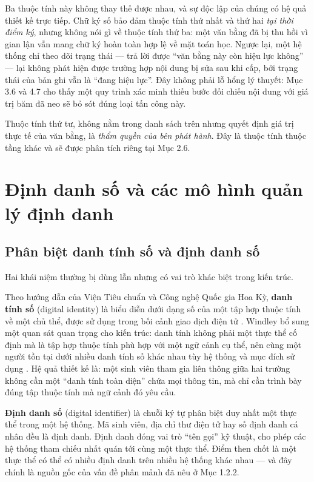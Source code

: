 Ba thuộc tính này không thay thế được nhau, và sự độc lập của chúng có hệ quả thiết kế trực tiếp. Chữ ký số bảo đảm thuộc tính thứ nhất và thứ hai \emph{tại thời điểm ký}, nhưng không nói gì về thuộc tính thứ ba: một văn bằng đã bị thu hồi vì gian lận vẫn mang chữ ký hoàn toàn hợp lệ về mặt toán học. Ngược lại, một hệ thống chỉ theo dõi trạng thái --- trả lời được {``}văn bằng này còn hiệu lực không{''} --- lại không phát hiện được trường hợp nội dung bị sửa sau khi cấp, bởi trạng thái của bản ghi vẫn là {``}đang hiệu lực{''}. Đây không phải lỗ hổng lý thuyết: Mục 3.6 và 4.7 cho thấy một quy trình xác minh thiếu bước đối chiếu nội dung với giá trị băm đã neo sẽ bỏ sót đúng loại tấn công này.

Thuộc tính thứ tư, không nằm trong danh sách trên nhưng quyết định giá trị thực tế của văn bằng, là \emph{thẩm quyền của bên phát hành}. Đây là thuộc tính thuộc tầng khác và sẽ được phân tích riêng tại Mục 2.6.

\section{Định danh số và các mô hình quản lý định danh}

\subsection{Phân biệt danh tính số và định danh số}

Hai khái niệm thường bị dùng lẫn nhưng có vai trò khác biệt trong kiến trúc.

Theo hướng dẫn của Viện Tiêu chuẩn và Công nghệ Quốc gia Hoa Kỳ, \textbf{danh tính số} (digital identity) là biểu diễn dưới dạng số của một tập hợp thuộc tính về một chủ thể, được sử dụng trong bối cảnh giao dịch điện tử \cite{NIST_SP800_63_3}. Windley bổ sung một quan sát quan trọng cho kiến trúc: danh tính không phải một thực thể cố định mà là tập hợp thuộc tính phù hợp với một ngữ cảnh cụ thể, nên cùng một người tồn tại dưới nhiều danh tính số khác nhau tùy hệ thống và mục đích sử dụng \cite{Windley2023}. Hệ quả thiết kế là: một sinh viên tham gia liên thông giữa hai trường không cần một {``}danh tính toàn diện{''} chứa mọi thông tin, mà chỉ cần trình bày đúng tập thuộc tính mà ngữ cảnh đó yêu cầu.

\textbf{Định danh số} (digital identifier) là chuỗi ký tự phân biệt duy nhất một thực thể trong một hệ thống. Mã sinh viên, địa chỉ thư điện tử hay số định danh cá nhân đều là định danh. Định danh đóng vai trò {``}tên gọi{''} kỹ thuật, cho phép các hệ thống tham chiếu nhất quán tới cùng một thực thể. Điểm then chốt là một thực thể có thể có nhiều định danh trên nhiều hệ thống khác nhau --- và đây chính là nguồn gốc của vấn đề phân mảnh đã nêu ở Mục 1.2.2.

